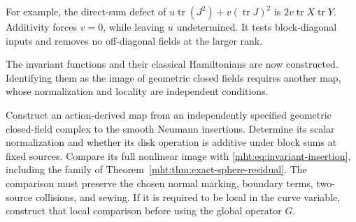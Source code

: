 For example, the direct-sum defect of
$u\operatorname{tr}(J^2)+v(\operatorname{tr}J)^2$ is
$2v\operatorname{tr}X\operatorname{tr}Y$.
Additivity forces $v=0$, while leaving $u$ undetermined.
It tests block-diagonal inputs and removes no off-diagonal fields at
the larger rank.

The invariant functions and their classical Hamiltonians are now
constructed. Identifying them as the image of geometric closed fields
requires another map, whose normalization and locality are independent
conditions.

\begin{problem}\label{mht:prob:closed-neumann-map}
Construct an action-derived map from an independently specified
geometric closed-field complex to the smooth Neumann insertions.
Determine its scalar normalization and whether its disk operation is
additive under block sums at fixed sources. Compare its full nonlinear
image with \eqref{mht:eq:invariant-insertion}, including the family of
Theorem~\ref{mht:thm:exact-sphere-residual}. The comparison must preserve
the chosen normal marking, boundary terms, two-source collisions, and
sewing. If it is required to be local in the curve variable, construct
that local comparison before using the global operator $G$.
\end{problem}
